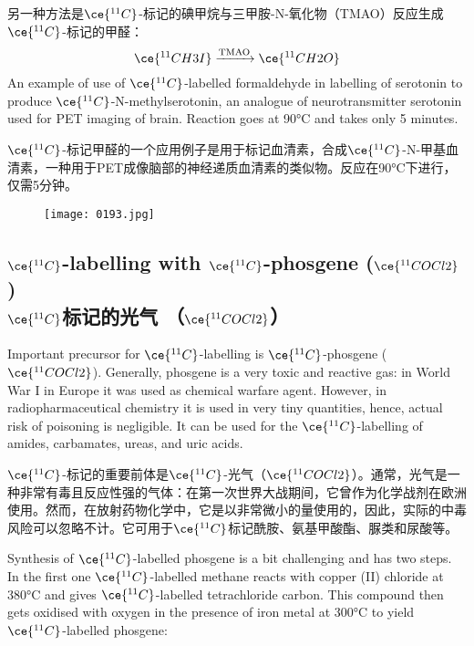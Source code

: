 \documentclass[dvipsnames, svgnames,a4paper,11pt]{article}
\begin{document}
另一种方法是\(\ce{^{11}C}\)-标记的碘甲烷与三甲胺-N-氧化物（TMAO）反应生成\(\ce{^{11}C}\)-标记的甲醛：  
\[
\ce{^{11}CH3I} \xrightarrow{\mathrm{TMAO}} \ce{^{11}CH2O}
\]
An example of use of \(\ce{^{11}C}\)-labelled formaldehyde in labelling of serotonin to produce \(\ce{^{11}C}\)-N-methylserotonin, an analogue of neurotransmitter serotonin used for PET imaging of brain. Reaction goes at 90°C and takes only 5 minutes.

\(\ce{^{11}C}\)-标记甲醛的一个应用例子是用于标记血清素，合成\(\ce{^{11}C}\)-N-甲基血清素，一种用于PET成像脑部的神经递质血清素的类似物。反应在90°C下进行，仅需5分钟。

\begin{figure}[h]
	\centering
    \texttt{[image: 0193.jpg]}  
     \label{fig229}
\end{figure}

\subsection{\(\ce{^{11}C}\)-labelling with \(\ce{^{11}C}\)-phosgene (\(\ce{^{11}COCl2}\)) \\ \(\ce{^{11}C}\)标记的光气 （\(\ce{^{11}COCl2}\)） }  
Important precursor for \(\ce{^{11}C}\)-labelling is \(\ce{^{11}C}\)-phosgene (\(\ce{^{11}COCl2}\)). Generally, phosgene is a very toxic and reactive gas: in World War I in Europe it was used as chemical warfare agent. However, in radiopharmaceutical chemistry it is used in very tiny quantities, hence, actual risk of poisoning is negligible. It can be used for the \(\ce{^{11}C}\)-labelling of amides, carbamates, ureas, and uric acids.  

\(\ce{^{11}C}\)-标记的重要前体是\(\ce{^{11}C}\)-光气（\(\ce{^{11}COCl2}\)）。通常，光气是一种非常有毒且反应性强的气体：在第一次世界大战期间，它曾作为化学战剂在欧洲使用。然而，在放射药物化学中，它是以非常微小的量使用的，因此，实际的中毒风险可以忽略不计。它可用于\(\ce{^{11}C}\)标记酰胺、氨基甲酸酯、脲类和尿酸等。  

Synthesis of \(\ce{^{11}C}\)-labelled phosgene is a bit challenging and has two steps. In the first one \(\ce{^{11}C}\)-labelled methane reacts with copper (II) chloride at 380°C and gives \(\ce{^{11}C}\)-labelled tetrachloride carbon. This compound then gets oxidised with oxygen in the presence of iron metal at 300°C to yield \(\ce{^{11}C}\)-labelled phosgene:  
\end{document}
